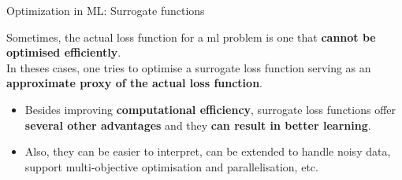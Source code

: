 \begin{frame}[t]{
    Optimization in ML: Surrogate functions}

    Sometimes, the actual \gls{loss function} 
    for a \gls{ml} problem is one that 
    {\bf cannot be optimised efficiently}.\\
    \vspace{0.2cm}
    In theses cases, one tries to optimise a
    \gls{surrogate loss function}
    serving as an {\bf approximate proxy of the actual \gls{loss function}}.\\
    \begin{itemize}
        \small
        \item    
            Besides improving {\bf computational efficiency}, 
            \glspl{surrogate loss function} offer {\bf several other advantages}
            and they {\bf can result in better learning}.
        \item 
            Also, they can be easier to interpret,
            can be extended to handle noisy data, 
            support multi-objective optimisation and parallelisation, etc.
    \end{itemize}


\end{frame}
